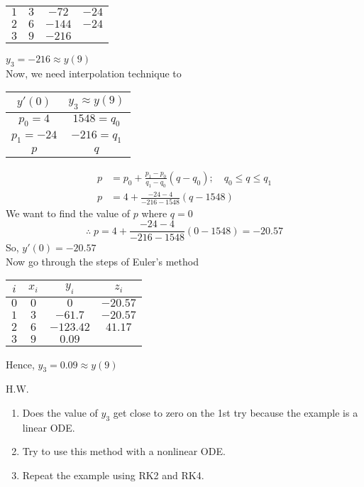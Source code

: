 \documentclass[../main-sheet.tex]{subfiles}
\begin{document}
\begin{soln}
\begin{table}[H]
\begin{tabular}{cccc}
            \(1\) & \(3\) & \(-72\) &\(-24\)\\
            \(2\) & \(6\) & \(-144\) &\(-24\)\\
            \(3\) & \(9\) & \(-216\) & \\\bottomrule
        \end{tabular}
    \end{table}
    \(y_3=-216\approx y(9)\)\\
    Now, we need interpolation technique to
    \begin{table}[H]
        \centering
        \begin{tabular}{cc}
            \toprule
            \(y'(0)\) & \(y_3\approx y(9)\) \\\midrule
            \(p_0=4\) & \(1548=q_0\)\\
            \(p_1=-24\) & \(-216=q_1\) \\
            \(p\) & \(q\) \\\bottomrule
        \end{tabular}
    \end{table}
    \begin{align*}
        p&=p_0+\frac{p_1-p_0}{q_1-q_0}(q-q_0);\quad q_0\leq q\leq q_1\\
        p&=4+\frac{-24-4}{-216-1548}(q-1548)
    \end{align*}
    We want to find the value of \(p\) where \(q=0\)
    \[\therefore \;p=4+\frac{-24-4}{-216-1548}(0-1548)=-20.57\]
    So, \(y'(0)=-20.57\)\\
    Now go through the steps of Euler's method
    \begin{table}[H]
        \centering
        \begin{tabular}{cccc}
            \toprule
            \(i\) & \(x_i\) & \(y_i\) &\(z_i\)\\\midrule
            \(0\) & \(0\) & \(0\) &\(-20.57\)\\
            \(1\) & \(3\) & \(-61.7\) &\(-20.57\)\\
            \(2\) & \(6\) & \(-123.42\) &\(41.17\)\\
            \(3\) & \(9\) & \(0.09\) & \\\bottomrule
        \end{tabular}
    \end{table}
    Hence, \(y_3=0.09\approx y(9)\)
\end{soln}
H.W.
\begin{enumerate}[label=(\roman*)]
    \item Does the value of \(y_3\) get close to zero on the 1st try because the example is a linear ODE.
    \item Try to use this method with a nonlinear ODE.
    \item Repeat the example using RK2 and RK4.
\end{enumerate}
\end{document}

